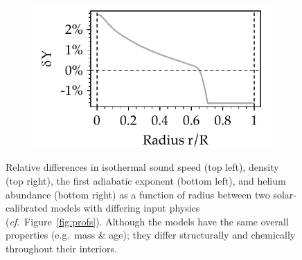 \begin{figure}
\begin{subfigure}[b]{0.5\linewidth}
    \end{subfigure}%
    \begin{subfigure}[b]{0.5\linewidth}
        \centering
        \includegraphics[width=\textwidth,keepaspectratio]{figs/pulse/diffs/d_Y-D_no_diffusion.pdf}%
    \end{subfigure}
    \caption[Structural differences between two solar models]{Relative differences in isothermal sound speed (top left), density (top right), the first adiabatic exponent (bottom left), and helium abundance (bottom right) as a function of radius between two solar-calibrated models with differing input physics (\emph{cf}.~Figure~\ref{fig:profs}). 
    Although the models have the same overall properties (e.g.\ mass \& age); they differ structurally and chemically throughout their interiors. %
    } 
    \label{fig:prof_diffs} 
\end{figure}




